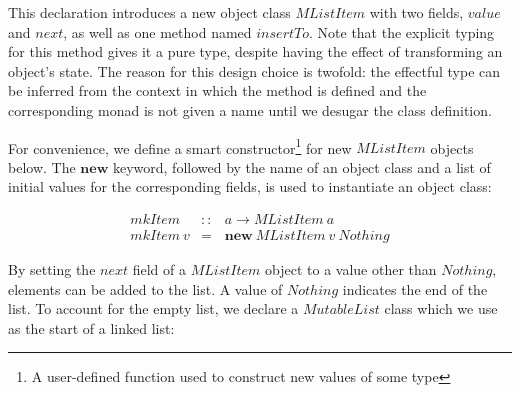 \documentclass[runningheads,a4paper]{llncs}
\begin{document}
This declaration introduces a new object class $\mathit{MListItem}$ with two fields, $\mathit{value}$ and $\mathit{next}$, as well as one method named $\mathit{insertTo}$. Note that the explicit typing for this method gives it a pure type, despite having the effect of transforming an object's state. The reason for this design choice is twofold: the effectful type can be inferred from the context in which the method is defined and the corresponding monad is not given a name until we desugar the class definition. %

For convenience, we define a smart constructor\footnote{A user-defined function used to construct new values of some type} for new $\mathit{MListItem}$ objects below. The $\mathbf{new}$ keyword, followed by the name of an object class and a list of initial values for the corresponding fields, is used to instantiate an object class:

\begin{displaymath}
\begin{array}{lcl}
\mathit{mkItem} & :: & a \to \mathit{MListItem}~a \\
\mathit{mkItem}~v & = & \mathbf{new}~\mathit{MListItem}~v~\mathit{Nothing}
\end{array}
\end{displaymath}

By setting the $\mathit{next}$ field of a $\mathit{MListItem}$ object to a value other than $\mathit{Nothing}$, elements can be added to the list. A value of $\mathit{Nothing}$ indicates the end of the list. To account for the empty list, we declare a $\mathit{MutableList}$ class which we use as the start of a linked list:
\end{document}
